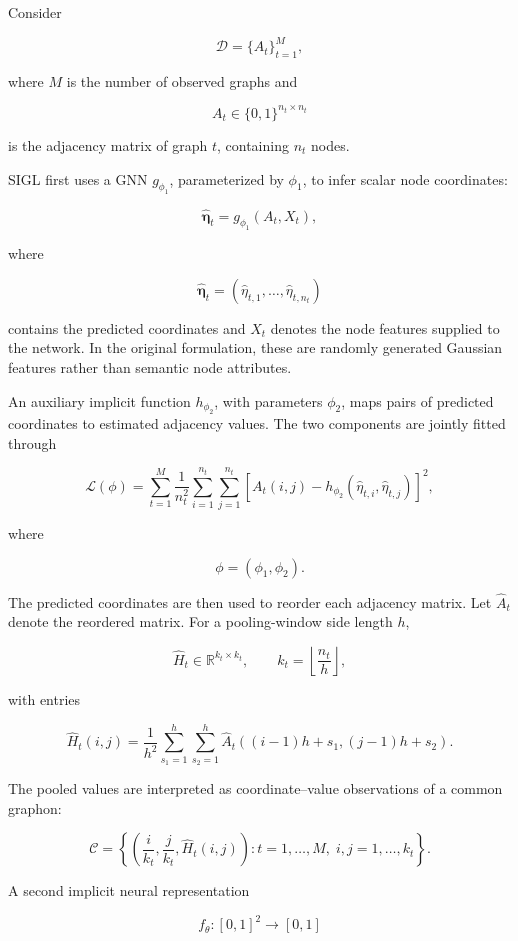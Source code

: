 Consider

\[
\mathcal{D}
=
\{A_t\}_{t=1}^{M},
\]

where \(M\) is the number of observed graphs and

\[
A_t\in\{0,1\}^{n_t\times n_t}
\]

is the adjacency matrix of graph \(t\), containing \(n_t\) nodes.

SIGL first uses a GNN \(g_{\phi_1}\), parameterized by \(\phi_1\), to infer scalar node coordinates:

\[
\hat{\boldsymbol{\eta}}_t
=
g_{\phi_1}(A_t,X_t),
\]

where

\[
\hat{\boldsymbol{\eta}}_t
=
(\hat{\eta}_{t,1},\ldots,\hat{\eta}_{t,n_t})
\]

contains the predicted coordinates and \(X_t\) denotes the node features supplied to the network. In the original formulation, these are randomly generated Gaussian features rather than semantic node attributes.

An auxiliary implicit function \(h_{\phi_2}\), with parameters \(\phi_2\), maps pairs of predicted coordinates to estimated adjacency values. The two components are jointly fitted through

\[
\mathcal{L}(\phi)
=
\sum_{t=1}^{M}
\frac{1}{n_t^2}
\sum_{i=1}^{n_t}
\sum_{j=1}^{n_t}
\left[
A_t(i,j)
-
h_{\phi_2}
\left(
\hat{\eta}_{t,i},
\hat{\eta}_{t,j}
\right)
\right]^2,
\]

where

\[
\phi=(\phi_1,\phi_2).
\]

The predicted coordinates are then used to reorder each adjacency matrix. Let \(\hat{A}_t\) denote the reordered matrix. For a pooling-window side length \(h\),

\[
\hat{H}_t
\in
\mathbb{R}^{k_t\times k_t},
\qquad
k_t
=
\left\lfloor
\frac{n_t}{h}
\right\rfloor,
\]

with entries

\[
\hat{H}_t(i,j)
=
\frac{1}{h^2}
\sum_{s_1=1}^{h}
\sum_{s_2=1}^{h}
\hat{A}_t
\left(
(i-1)h+s_1,
(j-1)h+s_2
\right).
\]

The pooled values are interpreted as coordinate--value observations of a common graphon:

\[
\mathcal{C}
=
\left\{
\left(
\frac{i}{k_t},
\frac{j}{k_t},
\hat{H}_t(i,j)
\right)
:
t=1,\ldots,M,\;
i,j=1,\ldots,k_t
\right\}.
\]

A second implicit neural representation

\[
f_\theta:[0,1]^2\rightarrow[0,1]
\]

